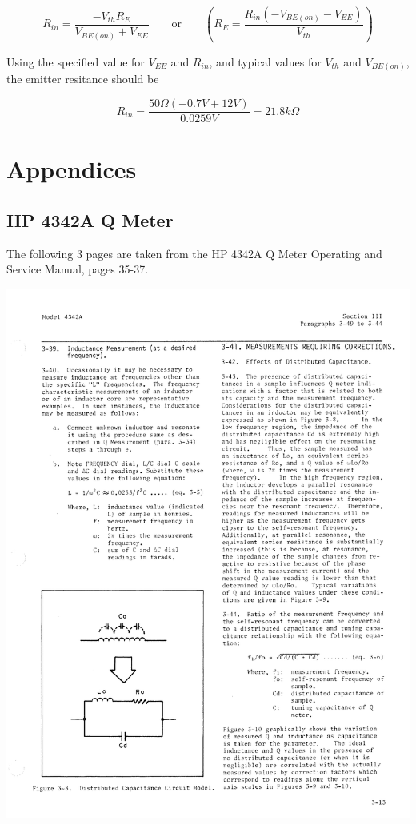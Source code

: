 \documentclass[titlepage, letterpaper, 11pt]{article}
\begin{document}
\begin{equation*}
R_{in}=\frac{-V_{th}R_{E}}{V_{BE(on)}+V_{EE}}
\qquad\textrm{or}\qquad
\left(R_{E}=\frac{R_{in}(-V_{BE(on)}-V_{EE})}{V_{th}}\right)
\end{equation*}

Using the specified value for $V_{EE}$ and $R_{in}$, and typical
values for $V_{th}$ and $V_{BE(on)}$, the emitter resitance should be

\begin{equation*}
R_{in}=\frac{50\Omega(-0.7V+12V)}{0.0259V}=21.8k\Omega
\end{equation*}

\section{Appendices}

\subsection{HP 4342A Q Meter}

The following 3 pages are taken from the HP 4342A Q Meter Operating
and Service Manual, pages 35-37.

\includegraphics[width=1\textwidth]{qMeter/page35}
\end{document}
